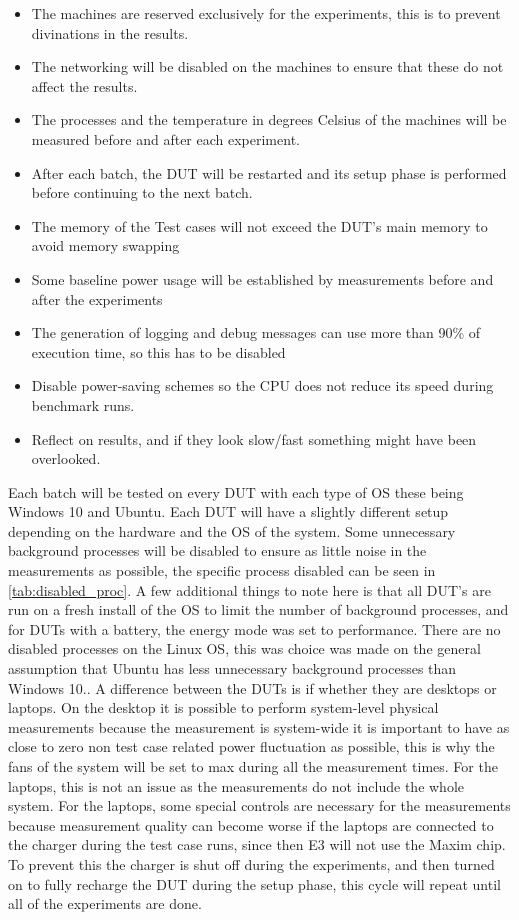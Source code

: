 \begin{itemize}
    \item The machines are reserved exclusively for the experiments, this is to prevent divinations in the results.
    \item The networking will be disabled on the machines to ensure that these do not affect the results.
    \item The processes and the temperature in degrees Celsius of the machines will be measured before and after each experiment.
    \item After each batch, the DUT will be restarted and its setup phase is performed before continuing to the next batch.
    \item The memory of the Test cases will not exceed the DUT's main memory to avoid memory swapping
    \item Some baseline power usage will be established by measurements before and after the experiments
    \item The generation of logging and debug messages can use more than 90\% of execution time, so this has to be disabled
    \item Disable power-saving schemes so the CPU does not reduce its speed during benchmark runs.
    \item Reflect on results, and if they look slow/fast something might have been overlooked.
\end{itemize}

Each batch will be tested on every DUT with each type of OS these being Windows 10 and Ubuntu. Each DUT will have a slightly different setup depending on the hardware and the OS of the system. Some unnecessary background processes will be disabled to ensure as little noise in the measurements as possible\cite*[]{sestoft2013microbenchmarks}, the specific process disabled can be seen in \cref{tab:disabled_proc}. A few additional things to note here is that all DUT's are run on a fresh install of the OS to limit the number of background processes, and for DUTs with a battery, the energy mode was set to performance. There are no disabled processes on the Linux OS, this was choice was made on the general assumption that Ubuntu has less unnecessary background processes than Windows 10.. A difference between the DUTs is if whether they are desktops or laptops. On the desktop it is possible to perform system-level physical measurements because the measurement is system-wide it is important to have as close to zero non test case related power fluctuation as possible, this is why the fans of the system will be set to max during all the measurement times. For the laptops, this is not an issue as the measurements do not include the whole system. For the laptops, some special controls are necessary for the measurements because measurement quality can become worse if the laptops are connected to the charger during the test case runs, since then E3 will not use the Maxim chip\cite{E3Video}. To prevent this the charger is shut off during the experiments, and then turned on to fully recharge the DUT during the setup phase, this cycle will repeat until all of the experiments are done.


